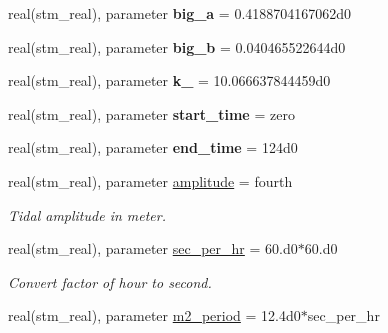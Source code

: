 \begin{CompactItemize}
\item 
\hypertarget{a00075_1b90d1dfb2dc693e901a30c34faba86b}{
real(stm\_\-real), parameter \textbf{big\_\-a} = 0.4188704167062d0}
\label{a00075_1b90d1dfb2dc693e901a30c34faba86b}

\item 
\hypertarget{a00075_eb31b4bae6845768030484bed978a90a}{
real(stm\_\-real), parameter \textbf{big\_\-b} = 0.040465522644d0}
\label{a00075_eb31b4bae6845768030484bed978a90a}

\item 
\hypertarget{a00075_eb86253215997660050af69310064623}{
real(stm\_\-real), parameter \textbf{k\_} = 10.066637844459d0}
\label{a00075_eb86253215997660050af69310064623}

\item 
\hypertarget{a00075_3d1a8e7d7d206a6c8c4d8565ae42d4c4}{
real(stm\_\-real), parameter \textbf{start\_\-time} = zero}
\label{a00075_3d1a8e7d7d206a6c8c4d8565ae42d4c4}

\item 
\hypertarget{a00075_388d4f0c2ae48eae0d24c20926515581}{
real(stm\_\-real), parameter \textbf{end\_\-time} = 124d0}
\label{a00075_388d4f0c2ae48eae0d24c20926515581}

\item 
\hypertarget{a00075_21dd7d4370f255884d0575af7c1f72d2}{
real(stm\_\-real), parameter \hyperlink{a00075_21dd7d4370f255884d0575af7c1f72d2}{amplitude} = fourth}
\label{a00075_21dd7d4370f255884d0575af7c1f72d2}

\begin{CompactList}\small\item\em Tidal amplitude in meter. \item\end{CompactList}\item 
\hypertarget{a00075_95529fc80d0c9206dee17d7defe1cd1c}{
real(stm\_\-real), parameter \hyperlink{a00075_95529fc80d0c9206dee17d7defe1cd1c}{sec\_\-per\_\-hr} = 60.d0$\ast$60.d0}
\label{a00075_95529fc80d0c9206dee17d7defe1cd1c}

\begin{CompactList}\small\item\em Convert factor of hour to second. \item\end{CompactList}\item 
\hypertarget{a00075_7069493925339bc094dc5d9e66a6ca3e}{
real(stm\_\-real), parameter \hyperlink{a00075_7069493925339bc094dc5d9e66a6ca3e}{m2\_\-period} = 12.4d0$\ast$sec\_\-per\_\-hr}
\label{a00075_7069493925339bc094dc5d9e66a6ca3e}


\end{CompactItemize}
